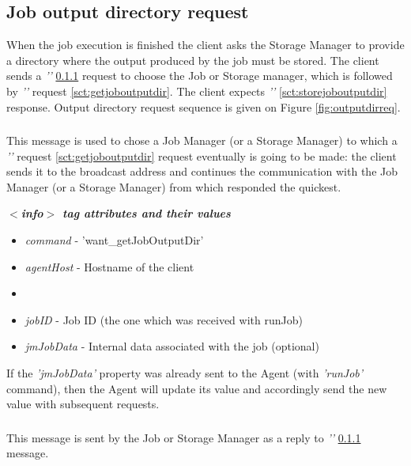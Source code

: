 \subsection{Job output directory request}
\label{sct:joboutput}
When the job execution is finished the client asks the Storage Manager to provide a directory where the output produced by the job must be stored. The client sends a \emph{''} \ref{sct:wantgetjoboutputdir} request to choose the Job or Storage manager, which is followed by \emph{''} request \ref{sct:getjoboutputdir}. The client expects  \emph{''} \ref{sct:storejoboutputdir} response. Output directory request sequence is given on Figure \ref{fig:outputdirreq}.

\subsubsection{}
\label{sct:wantgetjoboutputdir}
This message is used to chose a Job Manager (or a Storage Manager) to which a \emph{''} request \ref{sct:getjoboutputdir} request eventually is
going to be made: the client sends it to the broadcast address and continues the communication with the Job Manager (or a Storage Manager) from which responded the quickest.

\emph{\bf $<$info$>$ tag attributes and their values}
\begin{itemize}
  \item \emph{command} - 'want\_getJobOutputDir'
  \item \emph{agentHost} - Hostname of the client
  \item {}
  \item \emph{jobID} - Job ID (the one which was received with runJob)
  \item \emph{jmJobData} - Internal data associated with the job (optional)
\end{itemize}

If the \emph{'jmJobData'} property was already sent to the Agent (with \emph{'runJob'} command), then the Agent will update its value and accordingly send the new value with subsequent requests.

\subsubsection{}
\label{sct:havegetjoboutputdir}
This message is sent by the Job or Storage Manager as a reply to \emph{''} \ref{sct:wantgetjoboutputdir} message.

